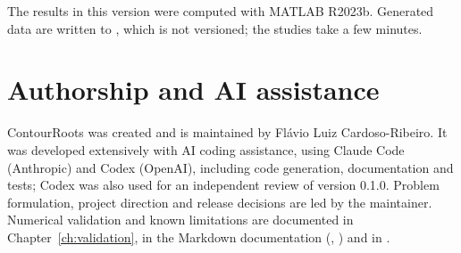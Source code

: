 The results in this version were computed with MATLAB R2023b. Generated
data are written to , which is not versioned; the studies take
a few minutes.

\section*{Authorship and AI assistance}

ContourRoots was created and is maintained by Flávio Luiz Cardoso-Ribeiro.
It was developed extensively with AI coding assistance, using Claude Code
(Anthropic) and Codex (OpenAI), including code generation, documentation and
tests; Codex was also used for an independent review of version 0.1.0. Problem formulation, project direction
and release decisions are led by the maintainer. Numerical validation and
known limitations are documented in Chapter~\ref{ch:validation}, in the
Markdown documentation (,
) and in .
